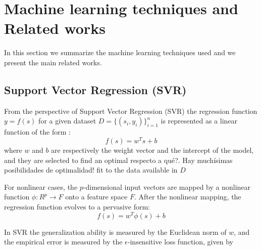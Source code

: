 \section{Machine learning techniques and Related works}
\label{sec:techs}

In this section we summarize the machine learning techniques used and we present the main related works.

\subsection{Support Vector Regression (SVR)}



From the perspective of Support Vector Regression (SVR) the regression
function $y = f(s)$ for a given dataset $D=\{(s_i,y_i)\}_{i=1}^n$ is
represented as a linear function of the form \citep{Wei2013}:
\begin{equation*}
  f(s)=w^Ts+b
\end{equation*}
where $w$ and $b$ are respectively the weight vector and the intercept
of the model, and they are selected to find an %
{optimal respecto a qué?.  Hay muchísimas posibilidades de optimalidad!}
%
fit to the data available in $D$ 

For nonlinear cases, the $p$-dimensional input vectors are mapped by a
nonlinear function $\phi : R^p\rightarrow F$ onto a feature space
$F$.  After the nonlinear mapping, the regression function evolves to a
pervasive form:
\begin{equation*}
f(s)=w^T \phi (s)+b
\end{equation*}

In SVR the generalization ability is measured by the Euclidean norm of
$w$, and the empirical error is measured by the $\epsilon$-insensitive
loss function, given by \citep{Cristiani2005}


